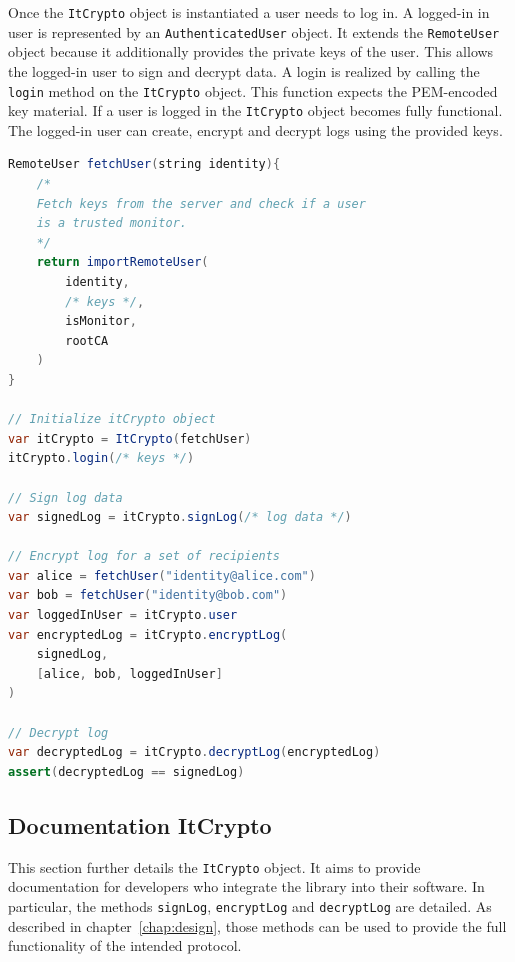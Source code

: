 \documentclass[../main.tex]{subfiles}
\begin{document}
Once the \verb|ItCrypto| object is instantiated a user needs to log in.
A logged-in in user is represented by an \verb|AuthenticatedUser| object.
It extends the \verb|RemoteUser| object because it additionally provides the private keys of the user.
This allows the logged-in user to sign and decrypt data.
A login is realized by calling the \verb|login| method on the \verb|ItCrypto| object.
This function expects the PEM-encoded key material.
If a user is logged in the \verb|ItCrypto| object becomes fully functional.
The logged-in user can create, encrypt and decrypt logs using the provided keys.

\begin{lstlisting}[basicstyle=\small, label=lst:pseudocode,float,floatplacement=tbp, language=Java, caption={[Pseudocode library usage]Pseudocode of creating, encrypting and decrypting logs using the provided libraries.}, morekeywords={RemoteUser, var, assert}, commentstyle=\color{codegreen}]
RemoteUser fetchUser(string identity){
    /*
    Fetch keys from the server and check if a user 
    is a trusted monitor.
    */
    return importRemoteUser(
        identity,
        /* keys */, 
        isMonitor, 
        rootCA
    )
}

// Initialize itCrypto object
var itCrypto = ItCrypto(fetchUser)
itCrypto.login(/* keys */)

// Sign log data
var signedLog = itCrypto.signLog(/* log data */)

// Encrypt log for a set of recipients
var alice = fetchUser("identity@alice.com")
var bob = fetchUser("identity@bob.com")
var loggedInUser = itCrypto.user
var encryptedLog = itCrypto.encryptLog(
    signedLog, 
    [alice, bob, loggedInUser]
)

// Decrypt log
var decryptedLog = itCrypto.decryptLog(encryptedLog)
assert(decryptedLog == signedLog)
\end{lstlisting}

\subsection{Documentation ItCrypto}
This section further details the \verb|ItCrypto| object.
It aims to provide documentation for developers who integrate the library into their software.
In particular, the methods \verb|signLog|, \verb|encryptLog| and \verb|decryptLog| are detailed.
As described in chapter~\ref{chap:design}, those methods can be used to provide the full functionality of the intended protocol.
\end{document}
